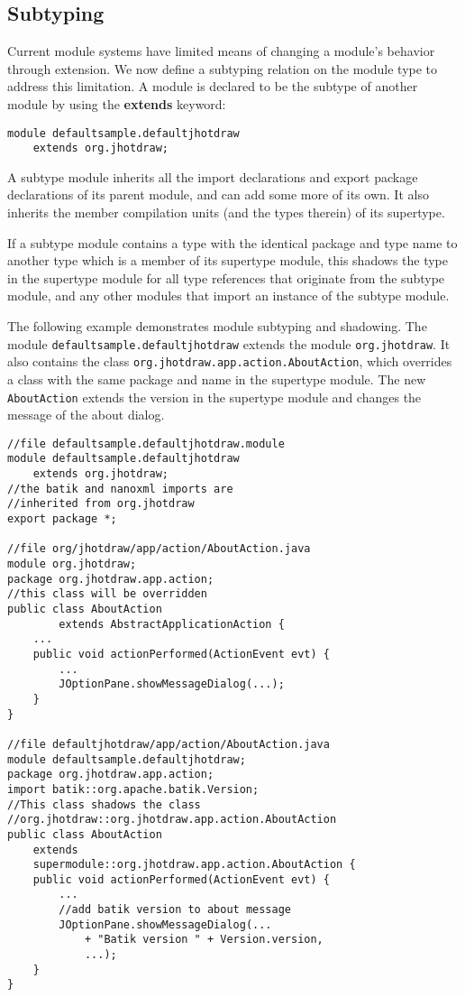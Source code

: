 \subsection{Subtyping}

Current module systems have limited means of changing a module's behavior through
extension. We now define a subtyping relation on the module type to address this limitation. 
A module is declared to be the subtype of another module by using the \textbf{extends} keyword:

\begin{lstlisting}
module defaultsample.defaultjhotdraw 
	extends org.jhotdraw;
\end{lstlisting}

A subtype module inherits all the import declarations and export package declarations 
of its parent module, and can add some more of its own. It also inherits the member 
compilation units (and the types therein) of its supertype.

If a subtype module contains a type with the identical package and type name
to another type which is a member of its supertype module, 
this shadows the type in the supertype module for all type references that
originate from the subtype module, and any other modules that import an
instance of the subtype module.

The following example demonstrates module subtyping and shadowing. The module
\texttt{defaultsample.defaultjhotdraw} extends the module \texttt{org.jhotdraw}. 
It also contains the class \texttt{org.jhotdraw.app.action.AboutAction},
which overrides a class with the same package and name in the supertype module.
The new \texttt{AboutAction} extends the version in the supertype module and
changes the message of the about dialog.

\begin{lstlisting}[caption=Module Subtyping]
//file defaultsample.defaultjhotdraw.module 
module defaultsample.defaultjhotdraw 
	extends org.jhotdraw;
//the batik and nanoxml imports are 
//inherited from org.jhotdraw
export package *;

//file org/jhotdraw/app/action/AboutAction.java
module org.jhotdraw;
package org.jhotdraw.app.action;
//this class will be overridden
public class AboutAction 
		extends AbstractApplicationAction {
	...
	public void actionPerformed(ActionEvent evt) {
		...
		JOptionPane.showMessageDialog(...);
	}
}

//file defaultjhotdraw/app/action/AboutAction.java
module defaultsample.defaultjhotdraw;
package org.jhotdraw.app.action;
import batik::org.apache.batik.Version;
//This class shadows the class
//org.jhotdraw::org.jhotdraw.app.action.AboutAction
public class AboutAction 
	extends 
	supermodule::org.jhotdraw.app.action.AboutAction {
	public void actionPerformed(ActionEvent evt) {
		...
		//add batik version to about message
		JOptionPane.showMessageDialog(...
			+ "Batik version " + Version.version,
			...);
	}
}

\end{lstlisting}

